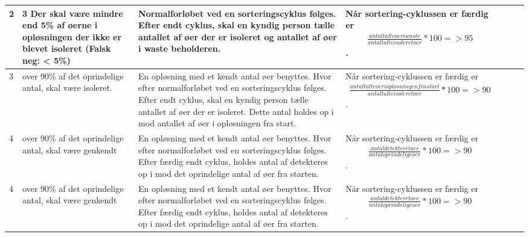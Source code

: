 \begin{center}
\begin{longtable}{ | m{1.785cm} | m{1.785cm}| m{1.785cm}| m{1.785cm}| m{1.785cm}| m{1.785cm}|m{1.785cm}| }
			\hline
2 &  3 Der skal være mindre end 5\% af øerne i opløsningen der ikke er blevet isoleret
(Falsk neg: < 5\%)

 & Normalforløbet ved en sorteringscyklus følges. Efter endt cyklus, skal en kyndig person tælle antallet af øer der er isoleret og antallet af øer i waste beholderen.  & Når sortering-cyklussen er færdig er
 \begin{align}
 \frac{antal talte øer i waste}{antal talte isoleret øer}*100= >95
 \end{align}
.   &  & & \\
			\hline		
			
			3 &  over 90\% af det oprindelige antal, skal være isoleret.

   & En opløsning med et kendt antal øer benyttes. Hvor efter normalforløbet ved en sorteringscyklus følges. Efter endt cyklus, skal en kyndig person tælle antallet af øer der er isoleret. Dette antal holdes op i mod antallet af øer i opløsningen fra start. & Når sortering-cyklussen er færdig er
 \begin{align}
 \frac{antal talte øer i opløsningen fra start}{antal talte isoleret øer}*100= >90
 \end{align}
.   &  & & \\
			\hline		
			
4 &  over 90\% af det oprindelige antal, skal være genkendt
   & En opløsning med et kendt antal øer benyttes. Hvor efter normalforløbet ved en sorteringscyklus følges. Efter færdig endt cyklus, holdes antal af detekteres op i mod det oprindelige antal af øer fra starten.
    & Når sortering-cyklussen er færdig er
 \begin{align}
 \frac{antal detekteret øer}{antal oprindelige øer}*100= >90
 \end{align}
.   &  & & \\
			\hline		
			
			4 &  over 90\% af det oprindelige antal, skal være genkendt
   & En opløsning med et kendt antal øer benyttes. Hvor efter normalforløbet ved en sorteringscyklus følges. Efter færdig endt cyklus, holdes antal af detekteres op i mod det oprindelige antal af øer fra starten.
    & Når sortering-cyklussen er færdig er
 \begin{align}
 \frac{antal detekteret øer}{antal oprindelige øer}*100= >90
 \end{align}
.   &  & & \\
			\hline			
			
		\end{longtable}
		
	\end{center}
	\pagebreak